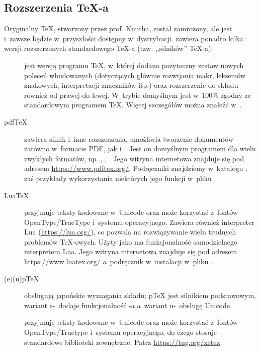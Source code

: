 \documentclass{article}
\begin{document}
\subsection{Rozszerzenia \protect\TeX-a}
\label{sec:tex-extensions}

Oryginalny \TeX{}, stworzony przez prof. Knutha, został zamrożony, ale jest
i~zawsze będzie w~przyszłości dostępny w~dystrybucji. \TL{} zawiera ponadto
kilka wersji rozszerzonych standardowego \TeX-a (tzw. ,,silników'' \TeX-a):

\begin{description}
\item [\eTeX] jest wersją \label{text:etex} programu \TeX{}, w~której dodano
 pożyteczny zestaw nowych poleceń wbudowanych
 (dotyczących głównie rozwijania makr, leksemów znakowych, interpretacji
 znaczników itp.) oraz rozszerzenie \TeXXeT{} do składu również
 od prawej do lewej. W~trybie domyślnym \eTeX{} jest w~100\% zgodny ze
 standardowym programem \TeX. Więcej szczegółów można znaleźć
 w~.

\item [pdf\TeX] zawiera silnik \eTeX{} i~inne
rozszerzenia, umożliwia tworzenie dokumentów zarówno w~formacie PDF, jak
i~\dvi{}. Jest on domyślnym programem dla wielu zwykłych formatów,
np. , , .
Jego witryna internetowa znajduje się pod adresem \url{https://www.pdftex.org/}.
Podręczniki znajdziemy w~katalogu ,
zaś przykłady wykorzystania niektórych jego funkcji
w~pliku .

\item[Lua\TeX] przyjmuje teksty kodowane w~Unicode oraz może korzystać
z~fontów OpenType\slash TrueType i~systemu operacyjnego. Zawiera również interpreter Lua
(\url{https://lua.org/}), co pozwala na rozwiązywanie wielu trudnych problemów \TeX-owych.
Użyty jako  ma funkcjonalność samodzielnego interpretera Lua.
Jego witryna internetowa znajduje się pod adresem \url{https://www.luatex.org/}
a~podręcznik w~instalacji w~pliku .

\item [(e)(u)p\TeX] obsługują japońskie wymagania składu; p\TeX{} jest
silnikiem podstawowym, wariant e-~dodaje funkcjonalność \eTeX{}-a
a~wariant u-~obsługę Unicode.

\item [\XeTeX] przyjmuje teksty kodowane w~Unicode oraz może korzystać
z~fontów OpenType\slash Truetype i~systemu operacyjnego,
do czego stosuje standardowe biblioteki zewnętrzne. Patrz \url{https://tug.org/xetex}.


\end{description}
\end{document}
